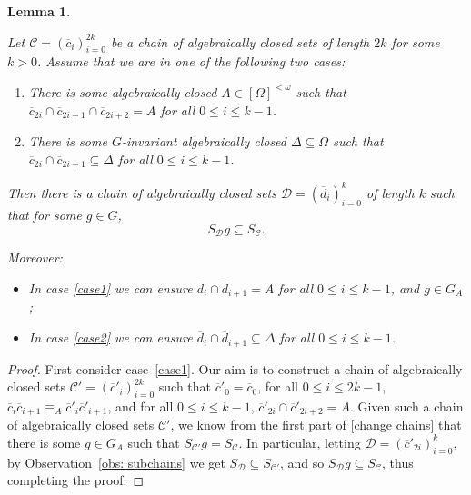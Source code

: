 \documentclass{article}
\newtheorem{lemma}[theorem]{Lemma}
\theoremstyle{remark}
\theoremstyle{definition}
\newcommand{\nn}[0]{S}%
\newcommand{\C}[0]{\mathcal{C}}
\newcommand{\D}[0]{\mathcal{D}}
\newcommand{\fps}[1]{[#1]^{<\omega}}
\renewcommand\leq{\leqslant}
\begin{document}
{{{{{  \begin{lemma}\label{skipping terms}

        Let $\C=(\overline{c}_i)_{i=0}^{2k}$ be a  chain of algebraically closed sets of length $2k$ for some $k>0$. Assume that we are in one of the following two cases:
	    \begin{enumerate}[label=(\Roman*)]
        \item \label{case1} {There is some algebraically closed $A\in\fps{\Omega}$ such that  $\overline{c}_{2i}\cap \overline{c}_{2i+1}\cap \overline{c}_{2i+2}=A$ for all $0\leq i\leq k-1$.}   
	    	\item \label{case2} 
            {There is some $G$-invariant algebraically closed $\Delta\subseteq\Omega$ such that $\overline{c}_{2i}\cap \overline{c}_{2i+1}\subseteq\Delta$ for all $0\leq i\leq k-1$.} 
            
	    \end{enumerate}
	    Then there is a chain of algebraically closed sets $\D=(\overline{d}_{i})_{i=0}^{k}$ of length $k$ such that for some $g\in G$, 
	    \begin{equation*}
	    	\nn_{\mathcal{D}}{g}\subseteq \nn_{\C}.
	    \end{equation*}

         Moreover: 
	     \begin{itemize}
	    	\item In case \ref{case1} we can ensure $\overline{d}_{i}\cap\overline{d}_{i+1}=A$ for all $0\leq i\leq k-1$, and $g\in G_{A}$;
            \item In case \ref{case2}  we can ensure $\overline{d}_{i}\cap \overline{d}_{i+1}\subseteq\Delta$ for all $0\leq i\leq k-1$.
	    \end{itemize}
  \end{lemma} 
\begin{proof}
{First consider case~\ref{case1}. 
Our aim is to construct a chain of algebraically closed sets
$\C'=(\overline{c}'_{i})_{i=0}^{2k}$ such that 
$\overline{c}'_{0}=\overline{c}_{0}$, 
for all $0\leq i\leq 2k-1$, $\overline{c}_{i}\overline{c}_{i+1}
\equiv_{A}
\overline{c}'_{i}\overline{c}'_{i+1}$, and for all $0\leq i\leq k-1$,
$\overline{c}'_{2i}\cap\overline{c}'_{2i+2}=A$.
Given such a chain of algebraically closed sets $\C'$, we know from the first
part of \cref{change chains} that there is some $g\in G_{A}$ such that $\nn_{\C'}g=
\nn_{\C}$. In particular, letting $\D=(\overline{c}'_{2i})_{i=0}^{k}$, by
Observation~\ref{obs: subchains} we get $\nn_\D\subseteq\nn_{\C'}$, and so $\nn_\D g\subseteq \nn_{\C}$, thus completing the proof.}


\end{proof}}}}}}
\end{document}
